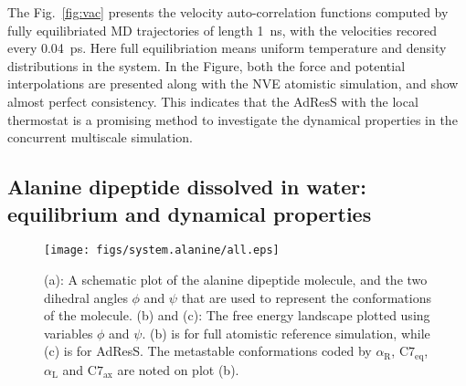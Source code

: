 \documentclass[epjST]{svjour}
\newcommand{\recheck}[1]{{\color{red} #1}}
\newcommand{\confa}[0]{{\alpha_{\textrm{R}}}}
\newcommand{\confb}[0]{{\textrm{C}7_{\textrm{eq}}}}
\newcommand{\confc}[0]{{\alpha_{\textrm{L}}}}
\newcommand{\confd}[0]{{\textrm{C}7_{\textrm{ax}}}}
\begin{document}
The Fig.~\ref{fig:vac} presents the velocity auto-correlation
functions computed by fully equilibriated MD trajectories of length 1~ns, with the
velocities recored every 0.04~ps.  Here full equilibriation means
uniform temperature and density distributions in the system.
In the Figure, both the force and potential interpolations are presented along with the
NVE atomistic simulation, and show almost perfect consistency.
This indicates that the AdResS with the local thermostat
is a promising method to investigate the dynamical properties
in the concurrent multiscale simulation.




\subsection{Alanine dipeptide dissolved in water: equilibrium and dynamical properties}

\begin{figure}
  \centering
  \texttt{[image: figs/system.alanine/all.eps]}
  \caption{(a): A schematic plot of the alanine dipeptide molecule,
    and the two dihedral angles $\phi$ and $\psi$ that are used to
    represent the conformations of the molecule. (b) and (c): The free
    energy landscape plotted using variables $\phi$ and $\psi$.  (b)
    is for full atomistic reference simulation, while (c) is for
    AdResS. The metastable conformations coded by $\confa$, $\confb$, $\confc$ and $\confd$
    are noted on plot (b).}
  \label{fig:ala}
\end{figure}
\end{document}
